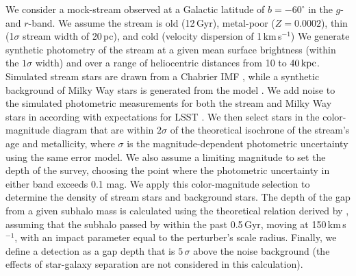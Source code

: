 We consider a mock-stream observed at a Galactic latitude of $b=-60^\circ$ in the $g$- and $r$-band. We assume the stream is old (12\,Gyr), metal-poor ($Z = 0.0002$), thin (1$\sigma$ stream width of 20\,pc), and cold (velocity dispersion of 1\,km\,s$^{-1}$) We generate synthetic photometry of the stream at a given mean surface brightness (within the $1\sigma$ width) and over a range of heliocentric distances from 10 to $40\mathrm{\,kpc}$.  Simulated stream stars are drawn from a Chabrier IMF \citep{2003PASP..115..763C}, while a synthetic background of Milky Way stars is generated from the  model \citep{sharma2011}. 
We add noise to the simulated photometric measurements for both the stream and Milky Way stars in according with expectations for LSST \citep{0805.2366}. 
We then select stars in the color-magnitude diagram that are within $2\sigma$ of the theoretical isochrone of the stream's age and metallicity, where $\sigma$ is the magnitude-dependent photometric uncertainty using the same error model. 
We also assume a limiting magnitude to set the depth of the survey, choosing the point where the photometric uncertainty in either band exceeds 0.1 mag. We apply this color-magnitude selection to determine the density of stream stars and background stars.
The depth of the gap from a given subhalo mass is calculated using the theoretical relation derived by \citet{erkal2016}, assuming that the subhalo passed by within the past 0.5\,Gyr, moving at 150\,km\,s$^{-1}$, with an impact parameter equal to the perturber's scale radius. Finally, we define a detection as a gap depth that is $5\,\sigma$ above the noise background (the effects of star-galaxy separation are not considered in this calculation).

